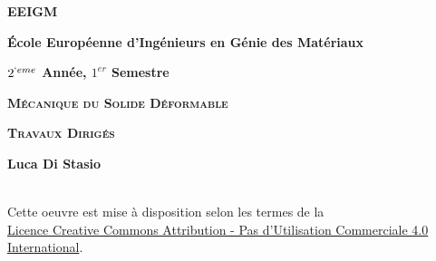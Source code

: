 \documentclass
[
a4paper,                      %
twoside,					  %
12pt,                         %
abstract,		      %
fleqn,                        %
]
{scrartcl} %
\begin{document}
\begin{center}

\vspace*{2cm}

\begin{Large}
\textbf{\textsc{EEIGM}}\\[0.75ex]
\end{Large}

\begin{large}
\textbf{\'Ecole Europ\'eenne d'Ing\'enieurs en G\'enie des Mat\'eriaux}\\[0.75ex]
\end{large}

\vspace{2cm}

\begin{large}
\textbf{$2^{`eme}$ Ann\'ee, $1^{er}$ Semestre}\\[0.75ex]
\end{large}
\vspace*{0.5cm}

\begin{Large}
\textbf{\textsc{M\'ecanique du Solide D\'eformable}}\\[0.75ex]
\end{Large}
\vspace*{0.5cm}

\begin{Large}
\textbf{\textsc{Travaux Dirig\'es}}\\[0.75ex]
\end{Large}
\vspace*{2.5cm}

\begin{large}
\textbf{Luca Di Stasio}\\[0.75ex]
\end{large}

\vspace{2cm}

\begin{large}
\ccLogo\ccAttribution\ccNonCommercial\\[0.75ex]
Cette oeuvre est mise \`a disposition selon les termes de la\\ \href{https://creativecommons.org/licenses/by-nc/4.0/deed.fr}{Licence Creative Commons Attribution - Pas d'Utilisation Commerciale 4.0 International}.\\[0.75ex]
\end{large}


\end{center}
\end{document}
